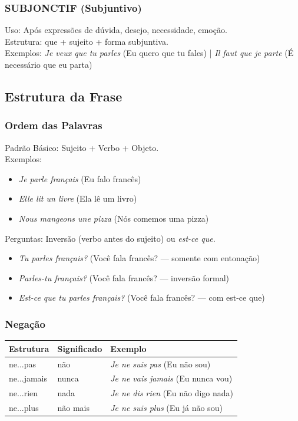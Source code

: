 \documentclass[a4paper,12pt]{article}
\begin{document}
\subsubsection{SUBJONCTIF (Subjuntivo)}
Uso: Após expressões de dúvida, desejo, necessidade, emoção. \\
Estrutura: que + sujeito + forma subjuntiva. \\
Exemplos: \emph{Je veux que tu parles} (Eu quero que tu fales) | \emph{Il faut que je parte} (É necessário que eu parta)

\subsection{Estrutura da Frase}
\subsubsection{Ordem das Palavras}
Padrão Básico: Sujeito + Verbo + Objeto. \\
Exemplos:
\begin{itemize}
    \item \emph{Je parle français} (Eu falo francês)
    \item \emph{Elle lit un livre} (Ela lê um livro)
    \item \emph{Nous mangeons une pizza} (Nós comemos uma pizza)
\end{itemize}
Perguntas: Inversão (verbo antes do sujeito) ou \emph{est-ce que}.
\begin{itemize}
    \item \emph{Tu parles français?} (Você fala francês? — somente com entonação)
    \item \emph{Parles-tu français?} (Você fala francês? — inversão formal)
    \item \emph{Est-ce que tu parles français?} (Você fala francês? — com est-ce que)
\end{itemize}

\subsubsection{Negação}
\begin{tabular}{lll}
    \toprule
    Estrutura & Significado & Exemplo \\
    \midrule
    ne...pas & não & \emph{Je ne suis pas} (Eu não sou) \\
    ne...jamais & nunca & \emph{Je ne vais jamais} (Eu nunca vou) \\
    ne...rien & nada & \emph{Je ne dis rien} (Eu não digo nada) \\
    ne...plus & não mais & \emph{Je ne suis plus} (Eu já não sou) \\
    \bottomrule
\end{tabular}
\end{document}
